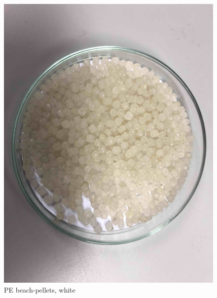 \begin{appendices}
\begin{figure}
    \centering
    \includegraphics[width = 12cm]{Images/appendix/PE-pellets-beached-texel-white.jpg}
    \caption[PE Beach Pellets, White]{PE beach-pellets, white}
    \label{fig:pe_beach_w}
\end{figure}


\end{appendices}
